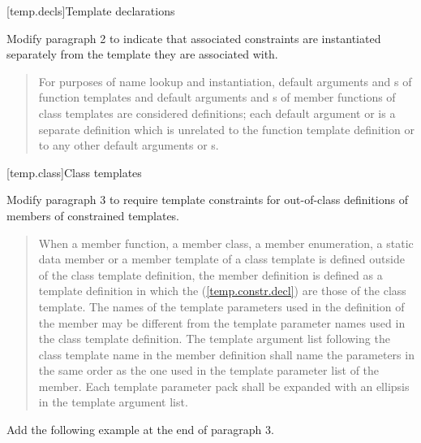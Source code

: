 \setcounter{section}{5}
[temp.decls]{Template declarations}

Modify paragraph 2 to indicate that associated constraints are
instantiated separately from the template they are associated with.

\begin{quote}
\setcounter{Paras}{1}
For purposes of name lookup and instantiation, default 
arguments and
s of function templates and default
arguments and 
s of member functions of class
templates are considered definitions; each default 
argument or 
 is a separate definition which is 
unrelated to the function template definition or to any other default 
arguments or 
s.
\end{quote}


[temp.class]{Class templates}

Modify paragraph 3 to require template constraints for out-of-class
definitions of members of constrained templates. 

\begin{quote}
\setcounter{Paras}{2}
\pnum
When a member function, a member class, a member enumeration, a static 
data member or a member template of a class template is defined outside 
of the class template definition, the member definition is defined as a 
template definition in which the 
 (\ref{temp.constr.decl}) are those of 
the class template.
% 
The names of the template parameters used in the definition of the 
member may be different from the template parameter names used in the 
class template definition. The template argument list following the class
template name in the member definition shall name the parameters in the 
same order as the one used in the template parameter list of the member. 
% 
Each template parameter pack shall be expanded with an ellipsis in the 
template argument list.
\end{quote}

Add the following example at the end of paragraph 3.


